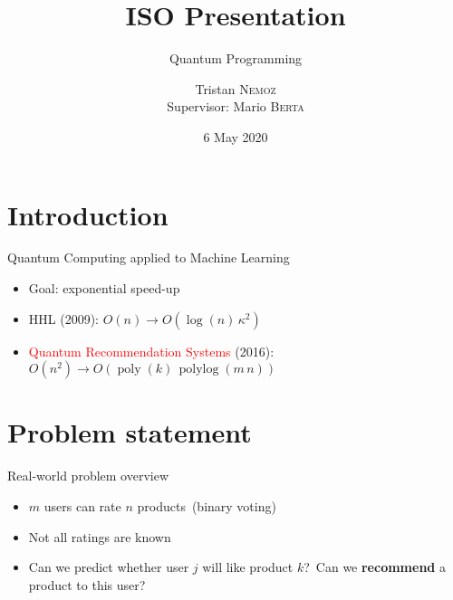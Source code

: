 \documentclass{beamer}
\title{ISO Presentation}
\subtitle{Quantum Programming}
\date{6 May 2020}
\author[Tristan \textsc{Nemoz}]{Tristan \textsc{Nemoz}\\{\small Supervisor: Mario \textsc{Berta}}}
\DeclareMathOperator{\polylog}{polylog}
\DeclareMathOperator{\poly}{poly}
\begin{document}
\begin{frame}
\maketitle
\end{frame}


\section{Introduction}

\begin{frame}{Quantum Computing applied to Machine Learning}
    \begin{itemize}
        \item Goal: exponential speed-up\pause
        \item HHL (2009): $O(n)\to O\left(\log(n)\,\kappa^2\right)$\pause
        \item \textcolor<4->{red}{Quantum Recommendation Systems} (2016): $O\left(n^2\right)\to O(\poly(k)\,\polylog(m\,n))$
    \end{itemize}
\end{frame}

\section{Problem statement}

\begin{frame}{Real-world problem overview}
    \begin{itemize}
        \item $m$ users can rate $n$ products\pause\ (binary voting)\pause
        \item Not all ratings are known\pause
        \item Can we predict whether user $j$ will like product $k$?\pause\ Can we \textbf{recommend} a product to this user?
    \end{itemize}
\end{frame}
\end{document}
